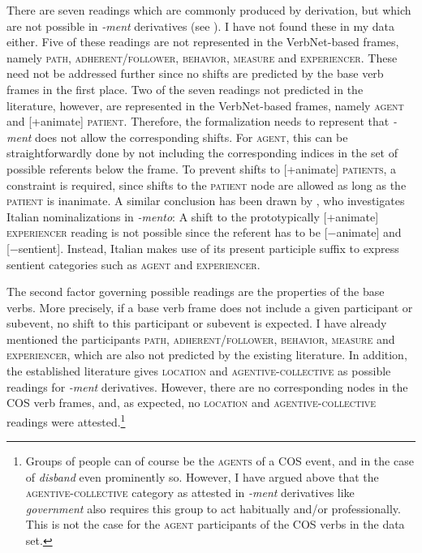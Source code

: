 There are seven readings which are commonly produced by derivation, but which are not possible in \textit{-ment} derivatives (see ). I have not found these in my data either. 
Five of these readings are not represented in the VerbNet-based frames, namely \textsc{path, adherent/follower, behavior, measure} and \textsc{experiencer}.
These need not be addressed further since no shifts are predicted by the base verb frames in the first place.
Two of the seven readings not predicted in the literature, however, are represented in the VerbNet-based frames, namely \textsc{agent} and [+animate] \textsc{patient}. Therefore, the formalization needs to represent that \textit{-ment} does not allow the corresponding shifts. For \textsc{agent}, this can be straightforwardly done by not including the corresponding indices in the set of possible referents below the frame. To prevent shifts to [+animate] \textsc{patients}, a constraint is required, since shifts to the \textsc{patient} node are allowed as long as the \textsc{patient} is inanimate. A similar conclusion has been drawn by \citet[115, 237]{Melloni.2011}, who investigates Italian nominalizations in \textit{-mento}: A shift to the  \textendash{}  prototypically [+animate]  \textendash{}  \textsc{experiencer} reading is not possible since the referent has to be [−animate] and [−sentient]. Instead, Italian makes use of its present participle suffix to express sentient categories such as \textsc{agent} and \textsc{experiencer}.

The second factor governing possible readings are the properties of the base verbs. More precisely, if a base verb frame does not include a given participant or subevent, no shift to this participant or subevent is expected. I have already mentioned the participants \textsc{path, adherent/follower, behavior, measure} and \textsc{experiencer}, which are also not predicted by the existing literature. 
In addition, the established literature gives \textsc{location} and \textsc{agentive-collective} as possible readings for \textit{-ment} derivatives. However, there are no corresponding nodes in the COS verb frames, and, as expected, no \textsc{location} and \textsc{agentive-collective} readings were attested.\footnote{Groups of people can of course be the \textsc{agents} of a COS event, and in the case of \textit{disband} even prominently so. However, I have argued above that the \textsc{agentive-collective} category as attested in \textit{-ment} derivatives like \textit{government} also requires this group to act habitually and/or professionally. This is not the case for the \textsc{agent} participants of the COS verbs in the data set.} 

